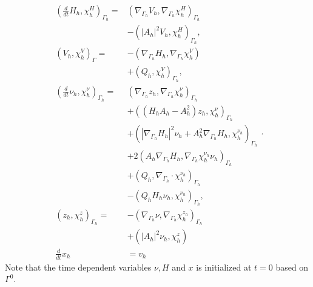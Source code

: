 
\begin{equation*}
    \begin{split}
\left( \frac{d}{dt}H_{h}, \chi_{h} ^{H} \right)_{\Gamma_{h} } =&  \left( \nabla _{\Gamma_{h} } V_{h}, \nabla _{\Gamma_{h} }\chi_{h} ^{H} \right) _{\Gamma_{h} } \nonumber \\
                                                   &- \left( \left\lvert A_{h} \right\rvert ^2 V_{h}, \chi_{h} ^{H} \right) _{\Gamma_{h} },   \\
\left( V_{h}, \chi_{h} ^{V} \right)_{\Gamma } =& -\left( \nabla _{\Gamma_{h} } H_{h}, \nabla _{\Gamma_{h} } \chi_{h} ^{V} \right) \nonumber \\
 & + \left( Q_{h}, \chi_{h} ^{V} \right)_{\Gamma_{h} },   \\
\left( \frac{d}{dt} \nu_{h} , \chi_{h} ^{\nu } \right)_{\Gamma_{h} } =& \left( \nabla _{\Gamma_{h} }z_{h}, \nabla _{\Gamma_{h} } \chi_{h} ^{\nu } \right) _{\Gamma_{h} }\nonumber   \\
 & + \left( ( H_{h}A_{h} - A_{h}^2  )z_{h},\chi_{h}^\nu  \right)_{\Gamma_{h} }   \nonumber \\
 & + \left( \left\lvert \nabla _{\Gamma_{h} } H_{h} \right\rvert^2 \nu_{h} + A_{h}^2\nabla _{\Gamma_{h} } H_{h}, \chi_{h} ^{\nu_{h} }  \right)_{\Gamma_{h}} \nonumber  \\
 & + 2 \left( A_{h} \nabla _{\Gamma_{h} } H_{h}, \nabla _{\Gamma_{h} } \chi_{h} ^{\nu_{h} } \nu_{h}  \right)_{\Gamma_{h}} \nonumber    \\
 &  + \left( Q_{h}, \nabla _{\Gamma_{h} } \cdot \chi_{h} ^{\nu_{h} }  \right)_{\Gamma_{h} } \nonumber  \\
  &- \left( Q_{h}H_{h}\nu_{h} , \chi_{h} ^{\nu_{h} } \right) _{\Gamma_{h}},\\
\left( z_{h}, \chi_{h} ^{z} \right) _{\Gamma_{h} }  =& - \left( \nabla _{\Gamma_{h} } \nu , \nabla _{\Gamma_{h} } \chi_{h} ^{z_{h}} \right)_{\Gamma_{h}} \nonumber \\
 & + \left( \left\lvert A_{h} \right\rvert ^2 \nu_{h} , \chi_{h} ^{z} \right) \\
\frac{d}{dt}x_h &= v_h
    \end{split}
.\end{equation*}
Note that the time dependent variables $\nu, H $ and $x$ is initialized at $t=0$  based on $\Gamma ^{0}$.













